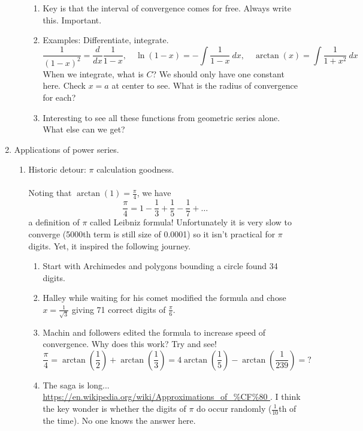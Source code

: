 \documentclass{article}
\begin{document}
\begin{enumerate}
\begin{enumerate}
\begin{enumerate}
\item Key is that the interval of convergence comes for free. Always write this. Important.

\item Examples: Differentiate, integrate.
\[
\frac{1}{(1-x)^2} = \frac{d}{dx}\frac{1}{1-x}, \quad \ln(1-x)=-\int \frac{1}{1-x}~dx, \quad \arctan(x) = \int \frac{1}{1+x^2}~dx
\]
When we integrate, what is $C$? We should only have one constant here. Check $x=a$ at center to see. What is the radius of convergence for each? 

\item Interesting to see all these functions from geometric series alone. What else can we get?
\end{enumerate}
\end{enumerate}

\item Applications of power series.
\begin{enumerate}

\item Historic detour: $\pi$ calculation goodness. \\ \ \\
Noting that $\arctan(1) = \frac{\pi}{4}$, we have 
\[
\frac{\pi}{4} = 1 - \frac{1}{3} + \frac{1}{5} - \frac{1}{7} + \dots
\]
a definition of $\pi$ called Leibniz formula! Unfortunately it is very slow to converge (5000th term is still size of 0.0001) so it isn't practical for $\pi$ digits. Yet, it inspired the following journey.
\begin{enumerate}
\item Start with Archimedes and polygons bounding a circle found 34 digits.
\item Halley while waiting for his comet modified the formula and chose $x=\frac{1}{\sqrt{3}}$ giving 71 correct digits of $\frac{\pi}{6}$.
\item Machin and followers edited the formula to increase speed of convergence. Why does this work? Try and see!
\[
\frac{\pi}{4} = \arctan\left(\frac{1}{2}\right)+\arctan\left(\frac{1}{3}\right) = 4\arctan\left(\frac{1}{5}\right)-\arctan\left(\frac{1}{239}\right) = ?
\]
\item The saga is long... \url{https://en.wikipedia.org/wiki/Approximations_of_%CF%80 }.
I think the key wonder is whether the digits of $\pi$ do occur randomly ($\frac{1}{10}$th of the time). No one knows the answer here.
\end{enumerate}


\end{enumerate}
\end{enumerate}
\end{document}
